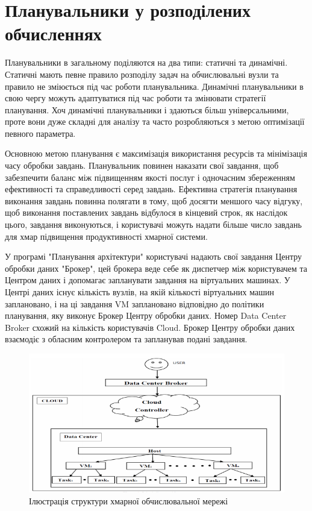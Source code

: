 \section{Планувальники у розподілених обчисленнях}

Планувальники в загальному поділяются на два типи: статичні та динамічні. Статичні мають певне правило розподілу задач на обчислювальні вузли та правило не зміюється під час роботи планувальника. Динамічні планувальники в свою чергу можуть адаптуватися під час роботи та змінювати стратегії планування. Хоч динамічні планувальники і здаються більш універсальними, проте вони дуже складні для аналізу та часто розробляються з метою оптимізації певного параметра.

Основною метою планування є максимізація використання ресурсів та мінімізація часу обробки завдань. Планувальник повинен наказати свої завдання, щоб забезпечити баланс між підвищенням якості послуг і одночасним збереженням ефективності та справедливості серед завдань. Ефективна стратегія планування виконання завдань повинна полягати в тому, щоб досягти меншого часу відгуку, щоб виконання поставлених завдань відбулося в кінцевий строк, як наслідок цього, завдання виконуються, і користувачі можуть надати більше число завдань для хмар підвищення продуктивності хмарної системи.

У програмі "Планування архітектури" користувачі надають свої завдання Центру обробки даних "Брокер", цей брокера веде себе як диспетчер між користувачем та Центром даних і допомагає запланувати завдання на віртуальних машинах. У Центрі даних існує кількість вузлів, на якій кількості віртуальних машин заплановано, і на ці завдання VM заплановано відповідно до політики планування, яку виконує Брокер Центру обробки даних. Номер Data Center Broker схожий на кількість користувачів Cloud. Брокер Центру обробки даних взаємодіє з обласним контролером та запланував подані завдання.

\begin{figure}[H]
	\centering
	\includegraphics[width=\textwidth]{task_analysis/img/cloud_representation}
	\caption{Ілюстрація структури хмарної обчислювальної мережі}
	\label{fig:cloud_representation}
\end{figure}

